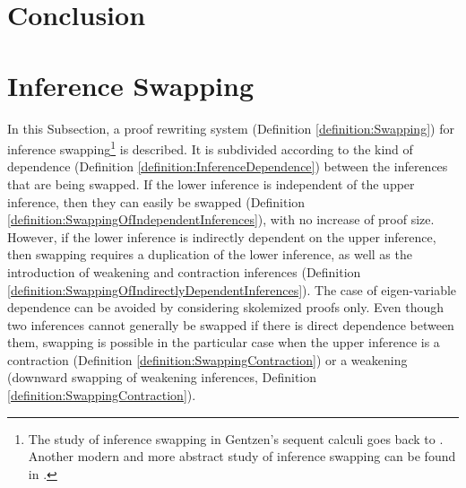 \documentclass{llncs}
\begin{document}
\section{Conclusion}






%

\appendix

\section{Inference Swapping}


In this Subsection, a proof rewriting system (Definition \ref{definition:Swapping}) for inference swapping\footnote{The study of inference swapping in Gentzen's sequent calculi goes back to \cite{Klenne1952TwoPapersonthePredicateCalculus}. Another modern and more abstract study of inference swapping can be found in \cite{Guenot2009ConcurrencyandPermutabilityintheSequentCalculus}.
}
is described. It is subdivided according to the kind of dependence (Definition \ref{definition:InferenceDependence}) between the inferences that are being swapped. If the lower inference is independent of the upper inference, then they can easily be swapped (Definition \ref{definition:SwappingOfIndependentInferences}), with no increase of proof size. However, if the lower inference is indirectly dependent on the upper inference, then swapping requires a duplication of the lower inference, as well as the introduction of weakening and contraction inferences (Definition \ref{definition:SwappingOfIndirectlyDependentInferences}). The case of eigen-variable dependence can be avoided by considering skolemized proofs only. Even though two inferences cannot generally be swapped if there is direct dependence between them, swapping is possible in the particular case when the upper inference is a contraction (Definition \ref{definition:SwappingContraction}) or a weakening (downward swapping of weakening inferences, Definition \ref{definition:SwappingContraction}). 
\end{document}
